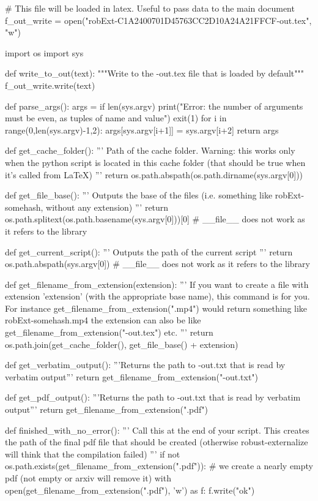 
# This file will be loaded in latex. Useful to pass data to the main document
f_out_write = open("robExt-C1A2400701D45763CC2D10A24A21FFCF-out.tex", "w")

import os
import sys

def write_to_out(text):
    """Write to the -out.tex file that is loaded by default"""
    f_out_write.write(text)

def parse_args():
    args = {}
    if len(sys.argv) %
        print("Error: the number of arguments must be even, as tuples of name and value")
        exit(1)
    for i in range(0,len(sys.argv)-1,2):
        args[sys.argv[i+1]] = sys.argv[i+2]
    return args

def get_cache_folder():
    '''
    Path of the cache folder. Warning: this works only when the python script
    is located in this cache folder (that should be true when it's called from LaTeX)
    '''
    return os.path.abspath(os.path.dirname(sys.argv[0]))

def get_file_base():
    '''
    Outputs the base of the files (i.e. something like robExt-somehash, without any extension)
    '''
    return os.path.splitext(os.path.basename(sys.argv[0]))[0] # __file__ does not work as it refers to the library

def get_current_script():
    '''
    Outputs the path of the current script
    '''
    return os.path.abspath(sys.argv[0]) # __file__ does not work as it refers to the library


def get_filename_from_extension(extension):
    '''
    If you want to create a file with extension 'extension' (with the appropriate base name), this command
    is for you. For instance get_filename_from_extension(".mp4") would return something like
    robExt-somehash.mp4
    the extension can also be like get_filename_from_extension("-out.tex") etc.
    '''
    return os.path.join(get_cache_folder(), get_file_base() + extension)

def get_verbatim_output():
    '''Returns the path to -out.txt that is read by verbatim output'''
    return get_filename_from_extension("-out.txt")

def get_pdf_output():
    '''Returns the path to -out.txt that is read by verbatim output'''
    return get_filename_from_extension(".pdf")


def finished_with_no_error():
    '''
    Call this at the end of your script. This creates the path of the final pdf file that should be
    created (otherwise robust-externalize will think that the compilation failed)
    '''
    if not os.path.exists(get_filename_from_extension(".pdf")):
        # we create a nearly empty pdf (not empty or arxiv will remove it)
        with open(get_filename_from_extension(".pdf"), 'w') as f:
            f.write("ok")

